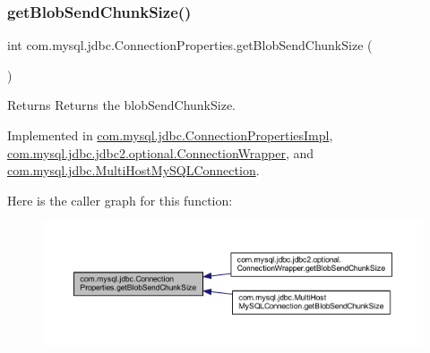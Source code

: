 \subsubsection{\texorpdfstring{get\+Blob\+Send\+Chunk\+Size()}{getBlobSendChunkSize()}}
{\footnotesize\ttfamily int com.\+mysql.\+jdbc.\+Connection\+Properties.\+get\+Blob\+Send\+Chunk\+Size (\begin{DoxyParamCaption}{ }\end{DoxyParamCaption})}

\begin{DoxyReturn}{Returns}
Returns the blob\+Send\+Chunk\+Size. 
\end{DoxyReturn}


Implemented in \mbox{\hyperlink{classcom_1_1mysql_1_1jdbc_1_1_connection_properties_impl_a5ca22a669571156661ef7710ceb5ecd3}{com.\+mysql.\+jdbc.\+Connection\+Properties\+Impl}}, \mbox{\hyperlink{classcom_1_1mysql_1_1jdbc_1_1jdbc2_1_1optional_1_1_connection_wrapper_a467921d50234ef25af6c18ebfa842db6}{com.\+mysql.\+jdbc.\+jdbc2.\+optional.\+Connection\+Wrapper}}, and \mbox{\hyperlink{classcom_1_1mysql_1_1jdbc_1_1_multi_host_my_s_q_l_connection_a699c99bdf14c617415353b9f1f001efa}{com.\+mysql.\+jdbc.\+Multi\+Host\+My\+S\+Q\+L\+Connection}}.

Here is the caller graph for this function\+:\nopagebreak
\begin{figure}[H]
\begin{center}
\leavevmode
\includegraphics[width=350pt]{interfacecom_1_1mysql_1_1jdbc_1_1_connection_properties_a722ef2a90bea1ca220340a055850527f_icgraph}
\end{center}
\end{figure}
\mbox{\label{interfacecom_1_1mysql_1_1jdbc_1_1_connection_properties_a24408439f0eeff0fd5181509fa6b68d0}} 
